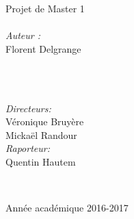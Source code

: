 \documentclass[12pt,a4paper]{report}
\theoremstyle{definition}%
\theoremstyle{remark}
\begin{document}
\begin{titlepage}
	\vspace{2cm}
	\begin{minipage}{0.4\textwidth}
		\begin{flushleft} \large
			Projet de Master 1\\ \quad \\
			\emph{Auteur :} \\Florent Delgrange
		\end{flushleft}
	\end{minipage}
	~
	\begin{minipage}{0.4\textwidth}
		\begin{flushright} \large
			\quad \\
			\emph{Directeurs:}\\ \quad Véronique Bruyère \\ \quad Mickaël Randour\\	\vspace*{0.5cm}
			\emph{Raporteur:}\\
			Quentin Hautem
		\end{flushright}
		
	\end{minipage}\\[5cm]
	
	
	\vspace{3.5cm}
	\begin{center}
			Ann\'ee acad\'emique 2016-2017
	\end{center}
	
	
	\vspace*{1cm}

	
	
	\vfill %
	
\end{titlepage}
\end{document}
